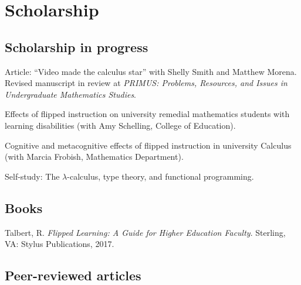 \documentclass[letterpaper]{article}
\renewenvironment{itemize}{
  \begin{list}{}{
    \setlength{\leftmargin}{1.5em}
	\setlength{\itemsep}{0in}
  }
}{
  \end{list}
}
\begin{document}
\section*{Scholarship}

\subsection*{Scholarship in progress}
\begin{itemize}
	\item Article: ``Video made the calculus star'' with Shelly Smith and Matthew Morena. Revised manuscript in review at \textit{PRIMUS: Problems, Resources, and Issues in Undergraduate Mathematics Studies}. 
	\item Effects of flipped instruction on university remedial mathematics students with learning disabilities (with Amy Schelling, College of Education). 
	\item Cognitive and metacognitive effects of flipped instruction in university Calculus (with Marcia Frobish, Mathematics Department). 
	\item Self-study: The $\lambda$-calculus, type theory, and functional programming. 
\end{itemize}

\subsection*{Books}


\begin{itemize}
	\item Talbert, R. \textit{Flipped Learning: A Guide for Higher Education Faculty}. Sterling, VA: Stylus Publications, 2017. 
\end{itemize}

\subsection*{Peer-reviewed articles}
\end{document}
